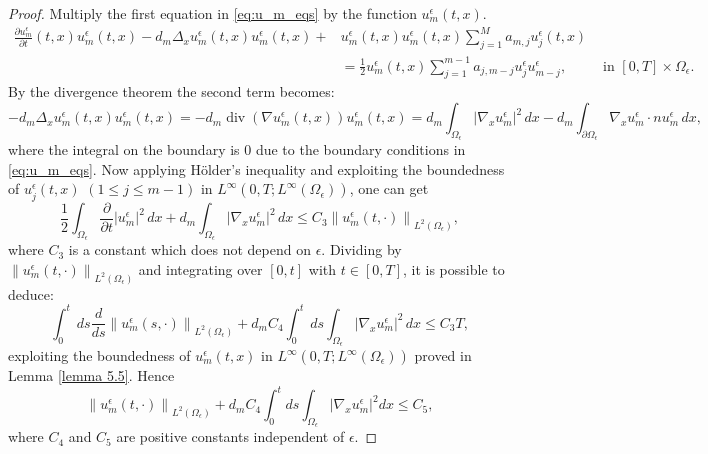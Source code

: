 \begin{proof}
 Multiply the first equation in \eqref{eq:u_m_eqs} by the function $u_{m}^{\epsilon}(t, x)$.
 \begin{equation*}
 \begin{aligned}
 \frac{\partial u_{m}^{\epsilon}}{\partial t}(t, x)u_{m}^{\epsilon}(t, x)-d_{m} \Delta_{x} u_{m}^{\epsilon}(t, x)u_{m}^{\epsilon}(t, x)+&u_{m}^{\epsilon}(t, x)u_{m}^{\epsilon}(t, x) \sum_{j=1}^{M} a_{m, j} u_{j}^{\epsilon}(t, x)\\ 
 &=\frac{1}{2} u_{m}^{\epsilon}(t, x)\sum_{j=1}^{m-1} a_{j, m-j} u_{j}^{\epsilon} u_{m-j}^{\epsilon}, & \text { in }[0, T] \times \Omega_{\epsilon}.
     \end{aligned}
 \end{equation*}
By the divergence theorem the second term becomes:
 \begin{equation*}
     -d_{m} \Delta_{x} u_{m}^{\epsilon}(t, x)u_{m}^{\epsilon}(t, x)= -d_m\operatorname{div} (\nabla u_{m}^{\epsilon}(t, x) )u_{m}^{\epsilon}(t, x)=d_m \int_{\Omega_\epsilon} \left|\nabla_{x} u_{m}^{\epsilon}\right|^{2} \, d  x - d_m\int_{\partial \Omega_\epsilon} \nabla_{x} u_{m}^{\epsilon} \cdot n u_{m}^{\epsilon} \, d  x,
 \end{equation*}
where the integral on the boundary is $0$ due to the boundary conditions in \eqref{eq:u_m_eqs}.
Now applying Hölder's inequality and exploiting the boundedness of $u_{j}^{\epsilon}(t, x)$ $(1 \leq j \leq m-1)$ in $L^{\infty}\left(0, T ; L^{\infty}\left(\Omega_{\epsilon}\right)\right)$, one can get
\begin{equation}
  \frac{1}{2} \int_{\Omega_{\epsilon}} \frac{\partial}{\partial t}\left|u_{m}^{\epsilon}\right|^{2} \, d  x+d_{m} \int_{\Omega_{\epsilon}}\left|\nabla_{x} u_{m}^{\epsilon}\right|^{2} \, d  x \leq C_{3}\left\|u_{m}^{\epsilon}(t, \cdot)\right\|_{L^{2}\left(\Omega_{\epsilon}\right)},
\label{eq 64}\end{equation}
where $C_{3}$ is a constant which does not depend on $\epsilon$. Dividing by $\left\|u_{m}^{\epsilon}(t, \cdot)\right\|_{L^{2}\left(\Omega_{\epsilon}\right)}$ and integrating over $[0, t]$ with $t \in[0, T]$, it is possible to deduce:
\begin{equation}
  \int_{0}^{t} \, d  s \frac{{d}}{{d} s}\left\|u_{m}^{\epsilon}(s, \cdot)\right\|_{L^{2}\left(\Omega_{\epsilon}\right)}+d_{m} C_{4} \int_{0}^{t} \, d  s \int_{\Omega_{\epsilon}}\left|\nabla_{x} u_{m}^{\epsilon}\right|^{2} \, d  x \leq C_{3} T,
\label{eq 65}\end{equation}
exploiting the boundedness of $u_{m}^{\epsilon}(t, x)$ in $L^{\infty}\left(0, T ; L^{\infty}\left(\Omega_{\epsilon}\right)\right)$ proved in Lemma \eqref{lemma 5.5}. Hence
\begin{equation}
  \left\|u_{m}^{\epsilon}(t, \cdot)\right\|_{L^{2}\left(\Omega_{\epsilon}\right)}+d_{m} C_{4} \int_{0}^{t} d  s \int_{\Omega_{\epsilon}}\left|\nabla_{x} u_{m}^{\epsilon}\right|^{2} d  x \leq C_{5},
\label{eq 66}\end{equation}
where $C_{4}$ and $C_{5}$ are positive constants independent of $\epsilon$.


\end{proof}

